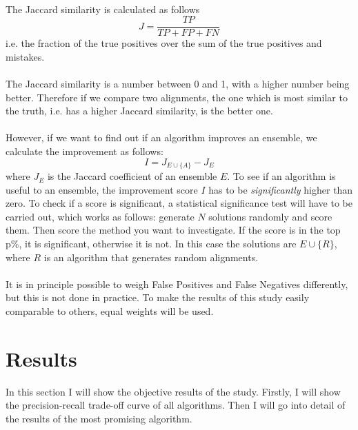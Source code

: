 \documentclass{article}
\begin{document}
 \paragraph{}
 The Jaccard similarity is calculated as follows
 \[
 J = \frac{TP}{TP + FP + FN}
 \]
 i.e. the fraction of the true positives over the sum of the true positives and mistakes.
 \paragraph{}
 The Jaccard similarity is a number between 0 and 1, with a higher number being better. Therefore if we compare two alignments, the one which is most similar to the truth, i.e. has a higher Jaccard similarity, is the better one.
 \paragraph{}
 However, if we want to find out if an algorithm improves an ensemble, we calculate the improvement as follows:
 \[
 I = J_{E\cup \{A\}} - J_E
 \]
 where $J_E$ is the Jaccard coefficient of an ensemble $E$.
 To see if an algorithm is useful to an ensemble, the improvement score $I$ has to be \emph{significantly} higher than zero. To check if a score is significant, a statistical significance test will have to be carried out, which works as follows: generate $N$ solutions randomly and score them. Then score the method you want to investigate. If the score is in the top p\%, it is significant, otherwise it is not. In this case the solutions are $E\cup \{R\}$, where $R$ is an algorithm that generates random alignments\cite{fisher1925statistical}.
 \paragraph{}
 It is in principle possible to weigh False Positives and False Negatives differently, but this is not done in practice. To make the results of this study easily comparable to others, equal weights will be used.
 
 \newpage
 \section{Results} \label{results}
 
 In this section I will show the objective results of the study. Firstly, I will show the precision-recall trade-off curve of all algorithms. Then I will go into detail of the results of the most promising algorithm.
 
\end{document}

